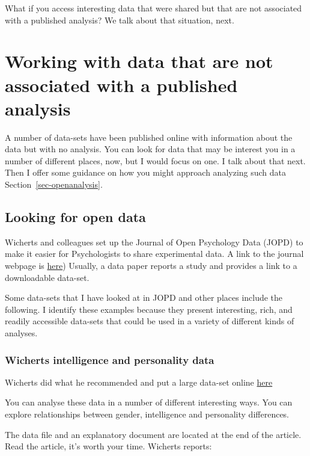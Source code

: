 \documentclass[
  letterpaper,
  DIV=11,
  numbers=noendperiod]{scrreprt}
\begin{document}
What if you access interesting data that were shared but that are not
associated with a published analysis? We talk about that situation,
next.

\hypertarget{sec-noanalysis}{%
\section{Working with data that are not associated with a published
analysis}\label{sec-noanalysis}}

A number of data-sets have been published online with information about
the data but with no analysis. You can look for data that may be
interest you in a number of different places, now, but I would focus on
one. I talk about that next. Then I offer some guidance on how you might
approach analyzing such data Section~\ref{sec-openanalysis}.

\hypertarget{sec-looking-for-open-data}{%
\subsection{Looking for open data}\label{sec-looking-for-open-data}}

Wicherts and colleagues set up the Journal of Open Psychology Data
(JOPD) to make it easier for Psychologists to share experimental data. A
link to the journal webpage is
\href{https://openpsychologydata.metajnl.com/articles/}{here}) Usually,
a data paper reports a study and provides a link to a downloadable
data-set.

Some data-sets that I have looked at in JOPD and other places include
the following. I identify these examples because they present
interesting, rich, and readily accessible data-sets that could be used
in a variety of different kinds of analyses.

\hypertarget{sec-how-wicherts}{%
\subsubsection{Wicherts intelligence and personality
data}\label{sec-how-wicherts}}

Wicherts did what he recommended and put a large data-set online
\href{http://www.sciencedirect.com/science/article/pii/S0160289612000050}{here}

You can analyse these data in a number of different interesting ways.
You can explore relationships between gender, intelligence and
personality differences.

The data file and an explanatory document are located at the end of the
article. Read the article, it's worth your time. Wicherts reports:
\end{document}
